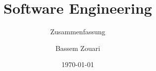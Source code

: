 \documentclass[
    ngerman,
    color=9c,
    loadcommon, %
    summary,
    boxarc,
    main,
]{rubos-tuda-template}
\title[SE]{Software Engineering}
\subtitle{Zusammenfassung}
\author{Bassem Zouari}
\date{\today}
\begin{document}
\maketitle{}
\tableofcontents %
\clearpage

%    

\clearpage

\clearpage

\clearpage

\clearpage

\clearpage

\clearpage

\clearpage

\clearpage

\clearpage

\clearpage

\end{document}
